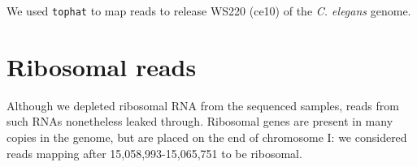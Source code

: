\documentclass{article}
\begin{document}
We used {\tt tophat} to map reads to release WS220 (ce10) of the {\em C. elegans} genome.



\section*{Ribosomal reads}

Although we depleted ribosomal RNA from the sequenced samples, reads from such RNAs nonetheless
leaked through. Ribosomal genes are present in many copies in the genome, but are placed on
the end of chromosome I: we considered reads mapping after 15,058,993-15,065,751 to be ribosomal.
\end{document}

